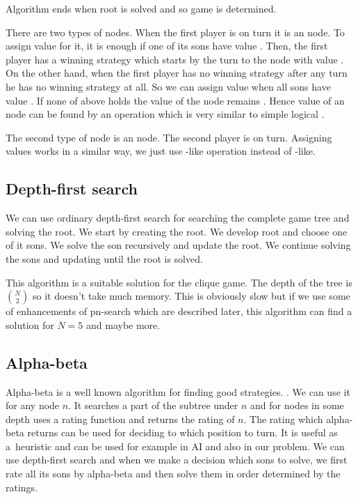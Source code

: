 Algorithm ends when root is solved and so game is determined.

There are two types of nodes. When the first player is on turn it is an 
node. To assign value \value{true} for it, it is enough if one of its sons
have value \value{true}. Then, the first player has a winning strategy which starts by the
turn to the node with value \value{true}. On the other hand, when the first player has
no winning strategy after any turn he has no winning strategy at all. So we can
assign value \value{false} when all sons have value \value{false}. If none of above holds
the value of the node remains \value{unknown}. Hence value of an  node can be found by
an operation which is very similar to simple logical .

The second type of node is an  node. The second player is on turn. Assigning values
works in a similar way, we just use -like operation instead of -like.


\subsection{Depth-first search} We can use ordinary depth-first search for
searching the complete game tree and solving the root.  We start by creating
the root. We develop root and choose one of it sons. We solve the son
recursively and update the root. We continue solving the sons and updating
until the root is solved.

This algorithm is a suitable solution for the clique game. The depth of the
tree is $N \choose 2$ so it doesn't take much memory. This is obviously slow
but if we use some of enhancements of pn-search which are described later, this
algorithm can find a solution for $N=5$ and maybe more.

\subsection{Alpha-beta}

Alpha-beta is a well known algorithm for finding good strategies. .
We can use it for any node $n$. It searches a part of the subtree under $n$ and for
nodes in some depth uses a rating function and returns the rating of $n$. The rating
which alpha-beta returns can be used for deciding to which position to turn. It
is useful as a~heuristic and can be used for example in AI and also in our
problem. We can use depth-first search and when we make a decision which sons
to solve, we first rate all its sons by alpha-beta and then solve them in order
determined by the ratings.

